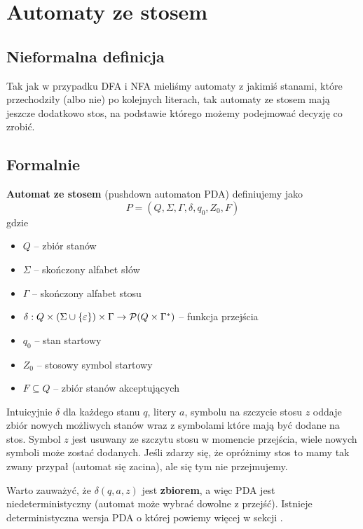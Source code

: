 \section{Automaty ze stosem}

\subsection{Nieformalna definicja}
Tak jak w przypadku DFA i NFA mieliśmy automaty z jakimiś stanami, które przechodziły (albo nie) po kolejnych literach, tak automaty ze stosem mają jeszcze dodatkowo stos, na podstawie którego możemy podejmować decyzję co zrobić.

\subsection{Formalnie}
\begin{definition}
    \textbf{Automat ze stosem} (pushdown automaton PDA) definiujemy jako
    \[
        P = (Q, \Sigma, \Gamma, \delta, q_0, Z_0, F)
    \]
    gdzie
    \begin{itemize}
        \item \( Q \) -- zbiór stanów
        \item \( \Sigma \) -- skończony alfabet słów
        \item \( \Gamma \) -- skończony alfabet stosu
        \item \( \delta : Q \times (\Sigma \cup \set{\eps}) \times \Gamma \rightarrow \powerset\pars{Q \times \Gamma^*} \) -- funkcja przejścia
        \item \( q_0 \) -- stan startowy
        \item \( Z_0\) -- stosowy symbol startowy
        \item \( F \subseteq Q \) -- zbiór stanów akceptujących
    \end{itemize}
\end{definition}
Intuicyjnie \( \delta \) dla każdego stanu \( q \), litery \( a \), symbolu na szczycie stosu \( z \) oddaje zbiór nowych możliwych stanów wraz z symbolami które mają być dodane na stos.
Symbol \( z \) jest usuwany ze szczytu stosu w momencie przejścia, wiele nowych symboli może zostać dodanych.
Jeśli zdarzy się, że opróżnimy stos to mamy tak zwany przypał (automat się zacina), ale się tym nie przejmujemy.

Warto zauważyć, że \( \delta(q, a, z) \) jest \textbf{zbiorem}, a więc PDA jest niedeterministyczny (automat może wybrać dowolne z przejść).
Istnieje deterministyczna wersja PDA o której powiemy więcej w sekcji .


